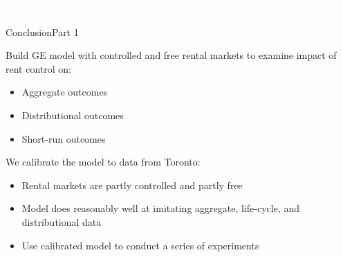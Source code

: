 \documentclass[11pt,aspectratio=169]{beamer}
\begin{document}
{
\begin{frame}{}

\centering \Large
\textcolor{white}{Conclusion}
    
\end{frame}

}

\begin{frame}{Conclusion}{Part 1}

Build GE model with controlled and free rental markets to examine impact of rent control on:
\begin{itemize}
    \item Aggregate outcomes
    \item Distributional outcomes
    \item Short-run outcomes
\end{itemize}

\vspace{0.5cm}

We calibrate the model to data from Toronto:
\begin{itemize}
    \item Rental markets are partly controlled and partly free
    \item Model does reasonably well at imitating aggregate, life-cycle, and distributional data
    \item Use calibrated model to conduct a series of experiments
\end{itemize}

\end{frame}
\end{document}
